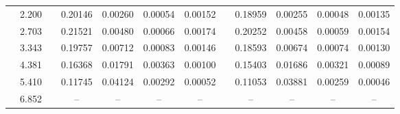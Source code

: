 \documentclass[aps,prc,superscriptaddress,showpacs,floatfix,twocolumn]{revtex4}
\begin{document}
\begin{table}[htbp]
\begin{ruledtabular}
\begin{tabular}{c|ccccccccccc}
 & 2.200 && 0.20146 & 0.00260 & 0.00054 & 0.00152 & & 0.18959 & 0.00255 & 0.00048 & 0.00135 \\ 
 & 2.703 && 0.21521 & 0.00480 & 0.00066 & 0.00174 & & 0.20252 & 0.00458 & 0.00059 & 0.00154 \\ 
 & 3.343 && 0.19757 & 0.00712 & 0.00083 & 0.00146 & & 0.18593 & 0.00674 & 0.00074 & 0.00130 \\ 
 & 4.381 && 0.16368 & 0.01791 & 0.00363 & 0.00100 & & 0.15403 & 0.01686 & 0.00321 & 0.00089 \\ 
 & 5.410 && 0.11745 & 0.04124 & 0.00292 & 0.00052 & & 0.11053 & 0.03881 & 0.00259 & 0.00046 \\ 
 & 6.852 && -- & -- & -- & -- & & -- & -- & -- & -- \\ 
\end{tabular} \end{ruledtabular} \endgroup
\end{table}
\end{document}
